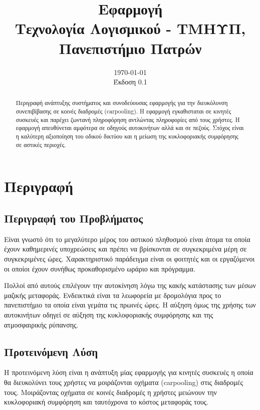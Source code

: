 \documentclass[11pt]{article}
\author{
    \developer{Γιάννης Ραβασόπουλος}{1100696}
    \developer{Κώστας Λουκανάρης}{1100610}
    \developer{Χρήστος Μάριος Νικολόπουλος}{1100644}
    \developer{Άγγελος Αβεντισιάν}{1100491}
    \developer{Βασίλης Μυλωνάς}{1100643}
}
\date{
    \today \\[1ex]
    Έκδοση 0.1 \\
}
\title{
     Εφαρμογή \appname\\[1ex]
    \large Τεχνολογία Λογισμικού - ΤΜΗΥΠ, Πανεπιστήμιο Πατρών \\[2ex]
}
\begin{document}
\maketitle
\thispagestyle{empty}
\newpage

\tableofcontents
\newpage

\begin{abstract}
    Περιγραφή ανάπτυξης συστήματος και συνοδεύουσας εφαρμογής για την διευκόλυνση
    συνεπιβίβασης σε κοινές διαδρομές (carpooling). Η εφαρμογή εγκαθισταται σε
    κινητές συσκευές και παρέχει ζωντανή πληροφόρηση
    αντλώντας πληροφορίες από τους χρήστες. H εφαρμογή απευθύνεται αμφότερα σε
    οδηγούς αυτοκινήτων αλλά και σε πεζούς. Στόχος είναι η καλύτερη αξιοποίηση
    του οδικού δικτύου και η μείωση της κυκλοφοριακής συμφόρησης σε αστικές
    περιοχές.
\end{abstract}

\newpage

\section{Περιγραφή}

\subsection{Περιγραφή του Προβλήματος}

Είναι γνωστό ότι το μεγαλύτερο μέρος του αστικού πληθυσμού είναι άτομα τα
οποία έχουν καθημερινές υποχρεώσεις και πρέπει να βρίσκονται
σε συγκεκριμένα μέρη σε συγκεκριμένες ώρες. Χαρακτηριστικό παράδειγμα είναι οι
φοιτητές και οι εργαζόμενοι οι οποίοι έχουν συνήθως προκαθορισμένο ωράριο και
πρόγραμμα.

Πολλοί από αυτούς επιλέγουν την αυτοκίνηση λόγω της κακής κατάστασης των μέσων
μαζικής μεταφοράς. Ενδεικτικά είναι τα λεωφορεία με δρομολόγια
προς το πανεπιστήμιο τα οποία είναι γεμάτα τις πρωινές ώρες. Η αύξηση όμως της
χρήσης των αυτοκινήτων οδηγεί σε αύξηση της κυκλοφοριακής συμφόρησης και
της ατμοσφαιρικής ρύπανσης.

\subsection{Προτεινόμενη Λύση}

Η προτεινόμενη λύση είναι η ανάπτυξη μίας εφαρμογής για κινητές συσκευές
η οποία θα διευκολύνει τους χρήστες να μοιράζονται οχήματα (carpooling) στις
διαδρομές τους. Μοιράζοντας οχήματα σε κοινές διαδρομές η χρήστες μειώνουν
την κυκλοφοριακή συμφόρηση και ταυτόχρονα το κόστος μεταφοράς τους.
\end{document}
